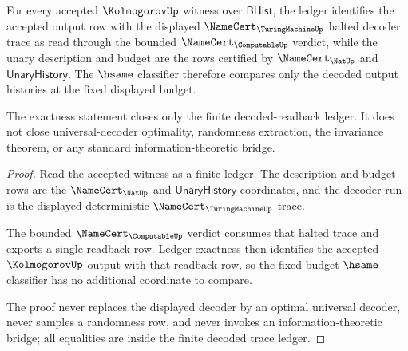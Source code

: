 \begin{theorem}
\label{thm:kolmogorov-decoded-readback-exactness}
For every accepted $\KolmogorovUp$ witness over $\mathsf{BHist}$, the ledger
identifies the accepted output row with the displayed
$\NameCert_{\TuringMachineUp}$ halted decoder trace as read through the bounded
$\NameCert_{\ComputableUp}$ verdict, while the unary description and budget are
the rows certified by $\NameCert_{\NatUp}$ and $\mathsf{UnaryHistory}$. The
$\hsame$ classifier therefore compares only the decoded output histories at
the fixed displayed budget.

The exactness statement closes only the finite decoded-readback ledger. It
does not close universal-decoder optimality, randomness extraction, the
invariance theorem, or any standard information-theoretic bridge.
\end{theorem}
\begin{proof}
Read the accepted witness as a finite ledger. The description and budget rows
are the $\NameCert_{\NatUp}$ and $\mathsf{UnaryHistory}$ coordinates, and the
decoder run is the displayed deterministic $\NameCert_{\TuringMachineUp}$
trace.

The bounded $\NameCert_{\ComputableUp}$ verdict consumes that halted trace and
exports a single readback row. Ledger exactness then identifies the accepted
$\KolmogorovUp$ output with that readback row, so the fixed-budget $\hsame$
classifier has no additional coordinate to compare.

The proof never replaces the displayed decoder by an optimal universal
decoder, never samples a randomness row, and never invokes an
information-theoretic bridge; all equalities are inside the finite decoded
trace ledger.
\end{proof}

